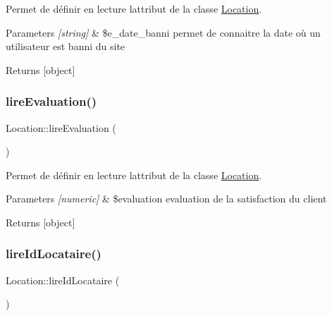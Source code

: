 Permet de définir en lecture l\textquotesingle{}attribut de la classe \hyperlink{class_location}{Location}. 


\begin{DoxyParams}{Parameters}
{\em \mbox{[}string\mbox{]}} & \$e\+\_\+date\+\_\+banni permet de connaitre la date où un utilisateur est banni du site \\
\hline
\end{DoxyParams}
\begin{DoxyReturn}{Returns}
\mbox{[}object\mbox{]} 
\end{DoxyReturn}
\mbox{\label{class_location_a7defef587f25226b708993dd1f95a84b}} 
\subsubsection{\texorpdfstring{lire\+Evaluation()}{lireEvaluation()}}
{\footnotesize\ttfamily Location\+::lire\+Evaluation (\begin{DoxyParamCaption}{ }\end{DoxyParamCaption})}



Permet de définir en lecture l\textquotesingle{}attribut de la classe \hyperlink{class_location}{Location}. 


\begin{DoxyParams}{Parameters}
{\em \mbox{[}numeric\mbox{]}} & \$evaluation evaluation de la satisfaction du client \\
\hline
\end{DoxyParams}
\begin{DoxyReturn}{Returns}
\mbox{[}object\mbox{]} 
\end{DoxyReturn}
\mbox{\label{class_location_a6854f6372729493f388ce39b52316c02}} 
\subsubsection{\texorpdfstring{lire\+Id\+Locataire()}{lireIdLocataire()}}
{\footnotesize\ttfamily Location\+::lire\+Id\+Locataire (\begin{DoxyParamCaption}{ }\end{DoxyParamCaption})}



